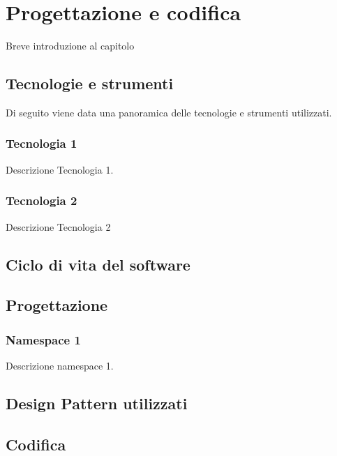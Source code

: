 \chapter{Progettazione e codifica}
\label{chap:progettazione-codifica}
Breve introduzione al capitolo

\section{Tecnologie e strumenti}
\label{sec:tecnologie-strumenti}
Di seguito viene data una panoramica delle tecnologie e strumenti utilizzati.

\subsection*{Tecnologia 1}
Descrizione Tecnologia 1.

\subsection*{Tecnologia 2}
Descrizione Tecnologia 2

\section{Ciclo di vita del software}
\label{sec:ciclo-vita-software}

\section{Progettazione}
\label{sec:progettazione}

\subsection{Namespace 1} %
Descrizione namespace 1.

\begin{namespacedesc}
\end{namespacedesc}

\section{Design Pattern utilizzati}

\section{Codifica}

\newpage